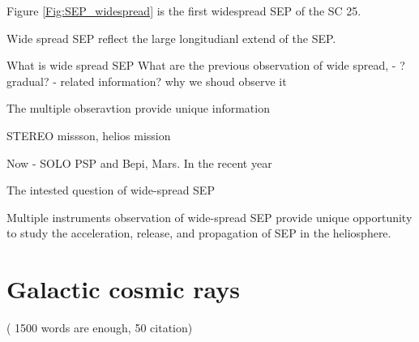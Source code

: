 Figure \ref{Fig:SEP_widespread} is the first widespread SEP of the SC 25. 

Wide spread SEP reflect the large longitudianl extend of the SEP.

What is wide spread SEP
What are the previous observation of wide spread, - ? gradual? - related information?
why we shoud observe it

The multiple obseravtion provide unique information

STEREO missson, helios mission 

Now - SOLO PSP and Bepi, Mars.
In the recent year

The intested question of wide-spread SEP



Multiple instruments observation of wide-spread SEP provide unique opportunity to study the acceleration, release, and propagation of SEP in the heliosphere.



\section{Galactic cosmic rays} ( 1500 words are enough, 50 citation)

